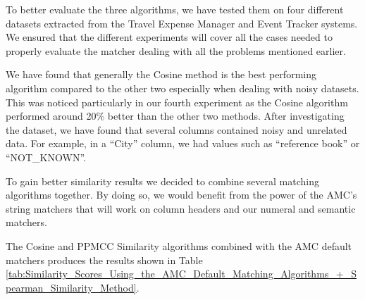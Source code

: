To better evaluate the three algorithms, we have tested them on four different datasets extracted from the Travel Expense Manager and Event Tracker systems. We ensured that the different experiments will cover all the cases needed to properly evaluate the matcher dealing with all the problems mentioned earlier.

We have found that generally the Cosine method is the best performing algorithm compared to the other two especially when dealing with noisy datasets. This was noticed particularly in our fourth experiment as the Cosine algorithm performed around 20\% better than the other two methods. After investigating the dataset, we have found that several columns contained noisy and unrelated data. For example, in a ``City'' column, we had values such as ``reference book'' or ``NOT\_KNOWN''.

To gain better similarity results we decided to combine several matching algorithms together. By doing so, we would benefit from the power of the AMC's string matchers that will work on column headers and our numeral and semantic matchers.

The Cosine and PPMCC Similarity algorithms combined with the AMC default matchers produces the results shown in Table \ref{tab:Similarity_Scores_Using_the_AMC_Default_Matching_Algorithms_+_Spearman_Similarity_Method}.

